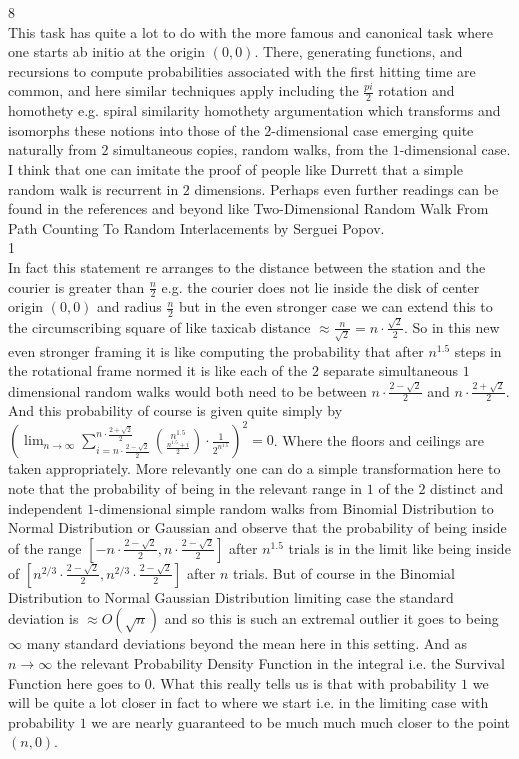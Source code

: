 8 \\
This task has quite a lot to do with the more famous and canonical task where one starts ab initio at the origin $(0,0)$. There, generating functions, and recursions to compute probabilities associated with the first hitting time are common, and here similar techniques apply including the $\frac{pi}{2}$ rotation and homothety e.g. spiral similarity homothety argumentation which transforms and isomorphs these notions into those of the $2$-dimensional case emerging quite naturally from $2$ simultaneous copies, random walks, from the $1$-dimensional case. I think that one can imitate the proof of people like Durrett that a simple random walk is recurrent in $2$ dimensions. Perhaps even further readings can be found in the references and beyond like Two-Dimensional Random Walk From Path Counting To Random Interlacements by Serguei Popov. \\
1 \\
In fact this statement re arranges to the distance between the station and the courier is greater than $\frac{n}{2}$ e.g. the courier does not lie inside the disk of center origin $(0,0)$ and radius $\frac{n}{2}$ but in the even stronger case we can extend this to the circumscribing square of like taxicab distance $\approx \frac{n}{\sqrt{2}} = n \cdot \frac{\sqrt{2}}{2}$. So in this new even stronger framing it is like computing the probability that after $n^{1.5}$ steps in the rotational frame normed it is like each of the $2$ separate simultaneous $1$ dimensional random walks would both need to be between $n \cdot \frac{2-\sqrt{2}}{2}$ and $n \cdot \frac{2+\sqrt{2}}{2}$. And this probability of course is given quite simply by $\left( \lim_{n \to \infty} \sum_{i=n \cdot \frac{2-\sqrt{2}}{2}}^{n \cdot \frac{2+\sqrt{2}}{2}} \binom{n^{1.5}}{\frac{n^{1.5}+i}{2}} \cdot \frac{1}{2^{n^{1.5}}} \right)^2 = 0$. Where the floors and ceilings are taken appropriately. More relevantly one can do a simple transformation here to note that the probability of being in the relevant range in $1$ of the $2$ distinct and independent $1$-dimensional simple random walks from Binomial Distribution to Normal Distribution or Gaussian and observe that the probability of being inside of the range $\left[ -n \cdot \frac{2-\sqrt{2}}{2},n \cdot \frac{2-\sqrt{2}}{2} \right]$ after $n^{1.5}$ trials is in the limit like being inside of $\left[ n^{2/3} \cdot \frac{2-\sqrt{2}}{2},n^{2/3} \cdot \frac{2-\sqrt{2}}{2} \right]$ after $n$ trials. But of course in the Binomial Distribution to Normal Gaussian Distribution limiting case the standard deviation is $\approx O(\sqrt{n})$ and so this is such an extremal outlier it goes to being $\infty$ many standard deviations beyond the mean here in this setting. And as $n \to \infty$ the relevant Probability Density Function in the integral i.e. the Survival Function here goes to $0$. What this really tells us is that with probability $1$ we will be quite a lot closer in fact to where we start i.e. in the limiting case with probability $1$ we are nearly guaranteed to be much much much closer to the point $(n,0)$.

